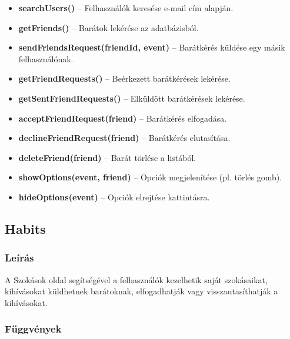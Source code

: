 \documentclass[12pt]{report}
\begin{document}
\begin{itemize}
  \item \textbf{searchUsers()} -- Felhasználók keresése e-mail cím alapján.
  \item \textbf{getFriends()} -- Barátok lekérése az adatbázisból.
  \item \textbf{sendFriendsRequest(friendId, event)} -- Barátkérés küldése egy másik felhasználónak.
  \item \textbf{getFriendRequests()} -- Beérkezett barátkérések lekérése.
  \item \textbf{getSentFriendRequests()} -- Elküldött barátkérések lekérése.
  \item \textbf{acceptFriendRequest(friend)} -- Barátkérés elfogadása.
  \item \textbf{declineFriendRequest(friend)} -- Barátkérés elutasítása.
  \item \textbf{deleteFriend(friend)} -- Barát törlése a listából.
  \item \textbf{showOptions(event, friend)} -- Opciók megjelenítése (pl. törlés gomb).
  \item \textbf{hideOptions(event)} -- Opciók elrejtése kattintásra.
\end{itemize}

\subsection{Habits}

\subsubsection{Leírás}
A Szokások oldal segítségével a felhasználók kezelhetik saját szokásaikat, kihívásokat küldhetnek barátoknak, elfogadhatják vagy visszautasíthatják a kihívásokat.

\subsubsection{Függvények}
\end{document}
